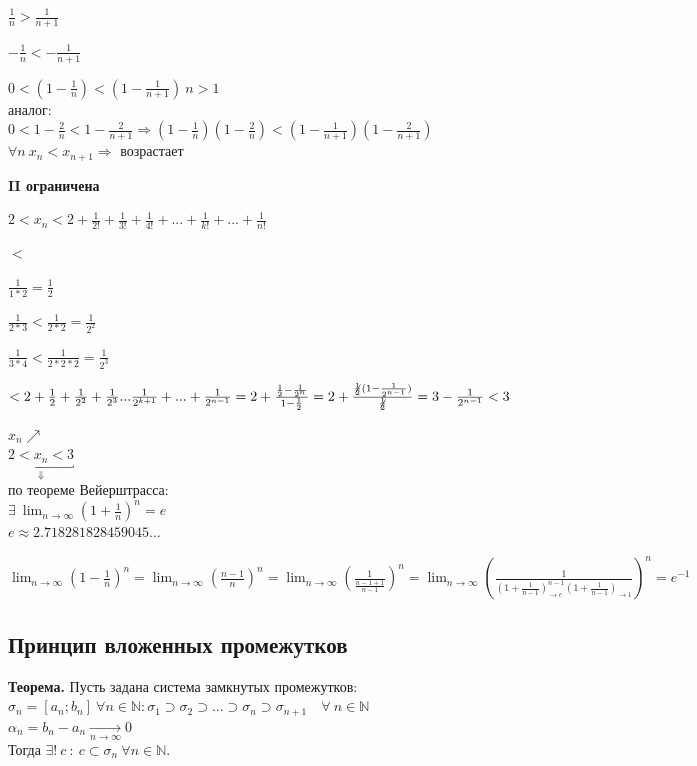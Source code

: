 \documentclass{article}
\begin{document}
\(\frac{1}{n} > \frac{1}{n+1}\)

\(-\frac{1}{n} < -\frac{1}{n+1}\)

\(0 < (1-\frac{1}{n}) < (1-\frac{1}{n+1})\ n > 1\) 
\\аналог: \\\(0 < 1-\frac{2}{n} < 1-\frac{2}{n+1} \Rightarrow (1-\frac{1}{n})(1-\frac{2}{n}) < (1 - \frac{1}{n+1})(1 - \frac{2}{n+1})\)
\\\(\forall n \ x_n < x_{n+1} \Rightarrow\) возрастает

\textbf{II ограничена}

\( 2 < x_n < 2 + \frac{1}{2!} + \frac{1}{3!} + \frac{1}{4!} + ... + \frac{1}{k!} + ... + \frac{1}{n!} \)

\( < \)

\( \frac{1}{1*2} = \frac{1}{2} \)

\( \frac{1}{2*3} < \frac{1}{2*2} = \frac{1}{2^2} \)

\( \frac{1}{3*4} < \frac{1}{2*2*2} = \frac{1}{2^3} \)

\(< 2 + \frac{1}{2} + \frac{1}{2^2} + \frac{1}{2^3} ... \frac{1}{2^{k+1}}+...+\frac{1}{2^{n-1}} = 2 + \frac{\frac{1}{2} - \frac{1}{2^n}}{1 - \frac{1}{2}} = 2 + \frac{\not\frac{1}{2}(1-\frac{1}{2^{n-1}})}{\not\frac{1}{2}} = 3 - \frac{1}{2^{n-1}} < 3\)

\( x_n \nearrow \)\\
\(\underbracket{2 < x_n < 3}_{\Downarrow} \)\\
по теореме Вейерштрасса:\\
\( \exists\ \lim_{n \rightarrow \infty} (1 + \frac{1}{n})^n = e \)
\\\(e \approx 2.718281828459045...\)

\(\lim_{n \rightarrow \infty}{(1 - \frac{1}{n})^n} = \lim_{n \rightarrow \infty}{(\frac{n-1}{n})^n} = \lim_{n \rightarrow \infty}{(\frac{1}{\frac{n-1+1}{n-1}})^n} = \lim_{n \rightarrow \infty}{(\frac{1}{(1 + \frac{1}{n-1})^{n-1}_{\rightarrow e}(1 + \frac{1}{n-1})_{\rightarrow 1}})^n} = e^{-1}\)

\subsection{Принцип вложенных промежутков}

\textbf{Теорема.} Пусть задана система замкнутых промежутков:\\
\(\sigma_n = [a_n; b_n]\ \forall n \in \mathbb{N}:\sigma_1 \supset \sigma_2 \supset ... \supset \sigma_n \supset \sigma_{n+1}\quad \forall\ n \in \mathbb{N}\)\\
\(\alpha_n = b_n - a_n \xrightarrow[n \rightarrow \infty]{} 0\)\\
Тогда \(\exists !\ c\ :\ c \subset \sigma_n\ \forall n \in \mathbb{N}\).
\end{document}

